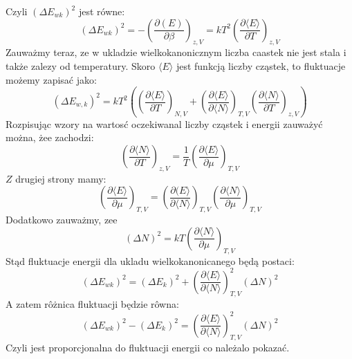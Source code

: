 \documentclass[12pt,a4paper]{article}
\begin{document}
Czyli $\left(\Delta E_{w k}\right)^{2}$ jest równe:
$$
\left(\Delta E_{w k}\right)^{2}=-\left(\frac{\partial(E)}{\partial \beta}\right)_{z, V}=k T^{2}\left(\frac{\partial\langle E\rangle}{\partial T}\right)_{z, V}
$$
Zauważmy teraz, ze w ukladzie wielkokanonicznym liczba caastek nie jest stala i także zalezy od temperatury. Skoro $\langle E\rangle$ jest funkcją liczby cząstek, to fluktuacje możemy zapisać jako:
$$
\left(\Delta E_{w, k}\right)^{2}=k T^{2}\left(\left(\frac{\partial\langle E\rangle}{\partial T}\right)_{N, V}+\left(\frac{\partial\langle E\rangle}{\partial\langle N\rangle}\right)_{T, V}\left(\frac{\partial\langle N\rangle}{\partial T}\right)_{z, V}\right)
$$
Rozpisując wzory na wartosć oczekiwanal liczby cząstek i energii zauważyć można, żee zachodzi:
$$
\left(\frac{\partial\langle N\rangle}{\partial T}\right)_{z, V}=\frac{1}{T}\left(\frac{\partial\langle E\rangle}{\partial \mu}\right)_{T, V}
$$
$Z$ drugiej strony mamy:
$$
\left(\frac{\partial\langle E\rangle}{\partial \mu}\right)_{T, V}=\left(\frac{\partial(E\rangle}{\partial\langle N\rangle}\right)_{T, V}\left(\frac{\partial\langle N\rangle}{\partial \mu}\right)_{T, V}
$$
Dodatkowo zauważmy, zee
$$
(\Delta N)^{2}=k T\left(\frac{\partial\langle N\rangle}{\partial \mu}\right)_{T, V}
$$
Stąd fluktuacje energii dla ukladu wielkokanonicanego będą postaci:
$$
\left(\Delta E_{w k}\right)^{2}=\left(\Delta E_{k}\right)^{2}+\left(\frac{\partial\langle E\rangle}{\partial\langle N\rangle}\right)_{T, V}^{2}(\Delta N)^{2}
$$
A zatem rôżnica fluktuacji będzie rôwna:
$$
\left(\Delta E_{w k}\right)^{2}-\left(\Delta E_{k}\right)^{2}=\left(\frac{\partial\langle E\rangle}{\partial\langle N\rangle}\right)_{T, V}^{2}(\Delta N)^{2}
$$
Czyli jest proporcjonalna do fluktuacji energii co należalo pokazać.
\end{document}
